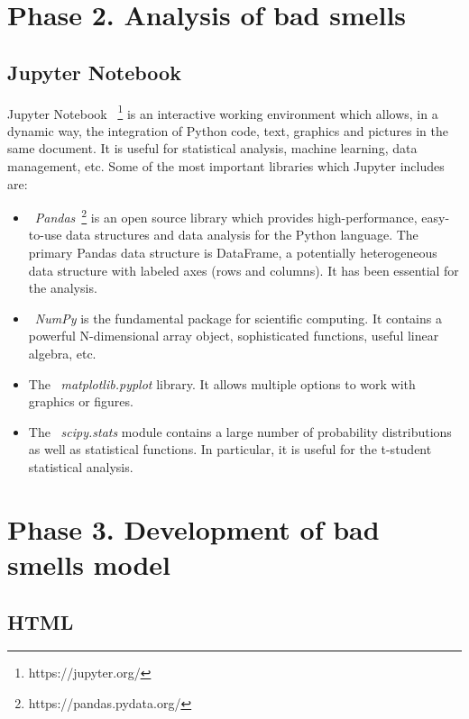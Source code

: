 \section{Phase 2. Analysis of bad smells}
\label{sec:phase_2}

\subsection{Jupyter Notebook}
\label{subsec:jupyter}

Jupyter Notebook ~\footnote{https://jupyter.org/} is an interactive working environment which allows, in a dynamic way, the integration of Python code, text, graphics and pictures in the same document. It is useful for statistical analysis, machine learning, data management, etc. Some of the most important libraries which Jupyter includes are:

\begin{itemize}
    \item ~\textit{Pandas}~\footnote{https://pandas.pydata.org/} is an open source library which provides high-performance, easy-to-use data structures and data analysis for the Python language. The primary Pandas data structure is DataFrame, a potentially heterogeneous data structure with labeled axes (rows and columns). It has been essential for the analysis.
    \item ~\textit{NumPy} is the fundamental package for scientific computing. It contains a powerful N-dimensional array object, sophisticated functions, useful linear algebra, etc.
    \item The ~\textit{matplotlib.pyplot} library. It allows multiple options to work with graphics or figures.
    \item The ~\textit{scipy.stats} module contains a large number of probability distributions as well as statistical functions. In particular, it is useful for the t-student statistical analysis. 
\end{itemize}



\section{Phase 3. Development of bad smells model}
\label{sec:phase_3}

\subsection{HTML}
\label{subsec:html}


